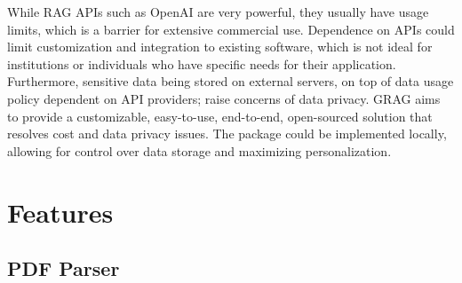 \documentclass{scrartcl}
\begin{document}
While RAG APIs such as OpenAI are very powerful, they usually have usage limits, which is a barrier for extensive commercial use.
Dependence on APIs could limit customization and integration to existing software, which is not ideal for institutions or individuals who have specific needs for their application.
Furthermore, sensitive data being stored on external servers, on top of data usage policy dependent on API providers; raise concerns of data privacy.
\newline
\newline
GRAG aims to provide a customizable, easy-to-use, end-to-end, open-sourced solution that resolves cost and data privacy issues. The package could be implemented locally, allowing for control over data storage and maximizing personalization.


\section{Features}

\subsection {PDF Parser}
\end{document}
